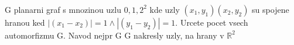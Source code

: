 \subsubsection{}
G planarni graf s mnozinou uzlu ${0,1,2}^2$ kde uzly $(x_1, y_1)
(x_2, y_2)$ su spojene hranou ked $|(x_1 - x_2)| = 1 \land |(y_1 -
y_2)| = 1$. Urcete pocet vsech automorfizmu G. Navod nejpr G G nakresly
uzly, na hrany v $\mathbb{R}^{2}$
